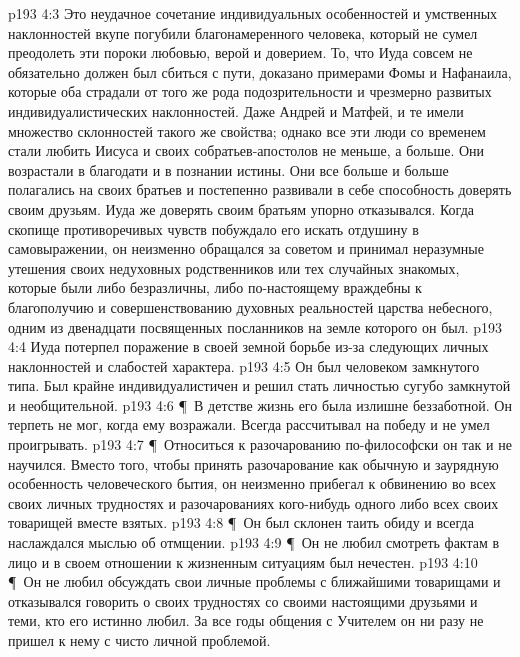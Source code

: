 \vs p193 4:3 Это неудачное сочетание индивидуальных особенностей и умственных наклонностей вкупе погубили благонамеренного человека, который не сумел преодолеть эти пороки любовью, верой и доверием. То, что Иуда совсем не обязательно должен был сбиться с пути, доказано примерами Фомы и Нафанаила, которые оба страдали от того же рода подозрительности и чрезмерно развитых индивидуалистических наклонностей. Даже Андрей и Матфей, и те имели множество склонностей такого же свойства; однако все эти люди со временем стали любить Иисуса и своих собратьев\hyp{}апостолов не меньше, а больше. Они возрастали в благодати и в познании истины. Они все больше и больше полагались на своих братьев и постепенно развивали в себе способность доверять своим друзьям. Иуда же доверять своим братьям упорно отказывался. Когда скопище противоречивых чувств побуждало его искать отдушину в самовыражении, он неизменно обращался за советом и принимал неразумные утешения своих недуховных родственников или тех случайных знакомых, которые были либо безразличны, либо по\hyp{}настоящему враждебны к благополучию и совершенствованию духовных реальностей царства небесного, одним из двенадцати посвященных посланников на земле которого он был.
\vs p193 4:4 Иуда потерпел поражение в своей земной борьбе из\hyp{}за следующих личных наклонностей и слабостей характера.
\vs p193 4:5 \bibnobreakspace Он был человеком замкнутого типа. Был крайне индивидуалистичен и решил стать личностью сугубо замкнутой и необщительной.
\vs p193 4:6 \P\ \bibnobreakspace В детстве жизнь его была излишне беззаботной. Он терпеть не мог, когда ему возражали. Всегда рассчитывал на победу и не умел проигрывать.
\vs p193 4:7 \P\ \bibnobreakspace Относиться к разочарованию по\hyp{}философски он так и не научился. Вместо того, чтобы принять разочарование как обычную и заурядную особенность человеческого бытия, он неизменно прибегал к обвинению во всех своих личных трудностях и разочарованиях кого\hyp{}нибудь одного либо всех своих товарищей вместе взятых.
\vs p193 4:8 \P\ \bibnobreakspace Он был склонен таить обиду и всегда наслаждался мыслью об отмщении.
\vs p193 4:9 \P\ \bibnobreakspace Он не любил смотреть фактам в лицо и в своем отношении к жизненным ситуациям был нечестен.
\vs p193 4:10 \P\ \bibnobreakspace Он не любил обсуждать свои личные проблемы с ближайшими товарищами и отказывался говорить о своих трудностях со своими настоящими друзьями и теми, кто его истинно любил. За все годы общения с Учителем он ни разу не пришел к нему с чисто личной проблемой.
